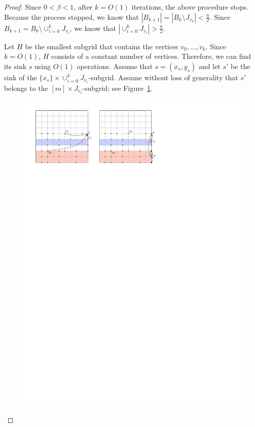 \documentclass[a4paper,10pt]{article}
\begin{document}
\begin{proof}
Since $0 < \beta < 1$, after $k = O(1)$ iterations, the above procedure stops. 
Because the process stopped, we know that $|B_{k+1}| = |B_k \setminus J_{v_k}| <  \frac{n}{2}$.
Since $B_{k+1} = B_0\setminus \cup_{i=0}^k J_{v_i}$, we know that $|\cup_{i=0}^k J_{v_i}| >  \frac{n}{2}$.

Let $H$ be the smallest subgrid that contains the vertices $v_0, \ldots, v_k$. Since $k = O(1)$, $H$ consists of a constant number of vertices. Therefore, we can find its sink $s$ using $O(1)$ operations. 
Assume that $s = (x_s, y_s)$ and let $s'$ be the sink of the $\{x_s\}\times \cup_{i=0}^k J_{v_i}$-subgrid. 
Assume without loss of generality that $s'$ belongs to the $[m]\times J_{v_i}$-subgrid; see Figure~\ref{fig:Climbing Lemma-2}.

\begin{figure}[h]
\centering
\includegraphics[width=1\textwidth]{ClimbingLemma-2.pdf}
\caption{\small }
\label{fig:Climbing Lemma-2}
\end{figure}


\end{proof}
\end{document}
